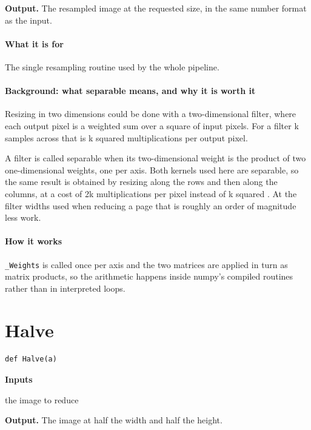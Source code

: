 \noindent\textbf{Output.} The resampled image at the requested size, in the same number format as the input.


\paragraph{What it is for}
The single resampling routine used by the whole pipeline.


\paragraph{Background: what separable means, and why it is worth it}
Resizing in two dimensions could be done with a two-dimensional filter, where each output pixel is a weighted sum over a square of input pixels. For a filter k samples across that is k squared multiplications per output pixel.

A filter is called separable when its two-dimensional weight is the product of two one-dimensional weights, one per axis. Both kernels used here are separable, so the same result is obtained by resizing along the rows and then along the columns, at a cost of 2k multiplications per pixel instead of k squared \cite{wolberg1990}. At the filter widths used when reducing a page that is roughly an order of magnitude less work.


\paragraph{How it works}
\texttt{\_Weights} is called once per axis and the two matrices are applied in turn as matrix products, so the arithmetic happens inside numpy's compiled routines rather than in interpreted loops.


\section{Halve}
\begin{lstlisting}[style=sig]
def Halve(a)
\end{lstlisting}

\noindent\textbf{Inputs}
\begin{description}[leftmargin=2.2em,style=nextline,font=\normalfont\ttfamily]\setlength\itemsep{1pt}
  \item[{img}] \normalfont the image to reduce
\end{description}

\noindent\textbf{Output.} The image at half the width and half the height.


